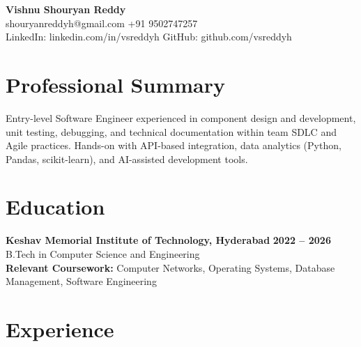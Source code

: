 \documentclass[a4paper,11pt]{article}
\newcommand{\resumeSubheading}[4]{%
  \textbf{#1} \hfill \textbf{#2} \\
{#3} \hfill {#4}
}
\begin{document}
\pagestyle{empty}
\raggedbottom
\addtolength{\textheight}{2\baselineskip}
\small

\begin{center}
  {\LARGE \textbf{Vishnu Shouryan Reddy}}\\
  \vspace{0.3em}
  shouryanreddyh@gmail.com \textbar{} +91 9502747257 \\
  \vspace{0.3em}
  LinkedIn: linkedin.com/in/vsreddyh \textbar{} GitHub: github.com/vsreddyh
\end{center}
\vspace{-0.8em}

\section*{Professional Summary}

Entry-level Software Engineer experienced in component design and development, unit testing, debugging, and technical documentation within team SDLC and Agile practices. Hands-on with API-based integration, data analytics (Python, Pandas, scikit-learn), and AI-assisted development tools.

\section*{Education}

\resumeSubheading
{Keshav Memorial Institute of Technology, Hyderabad}{2022 -- 2026}
{B.Tech in Computer Science and Engineering}{} \\
\textbf{Relevant Coursework:} Computer Networks, Operating Systems, Database Management, Software Engineering


\section*{Experience}
\end{document}
